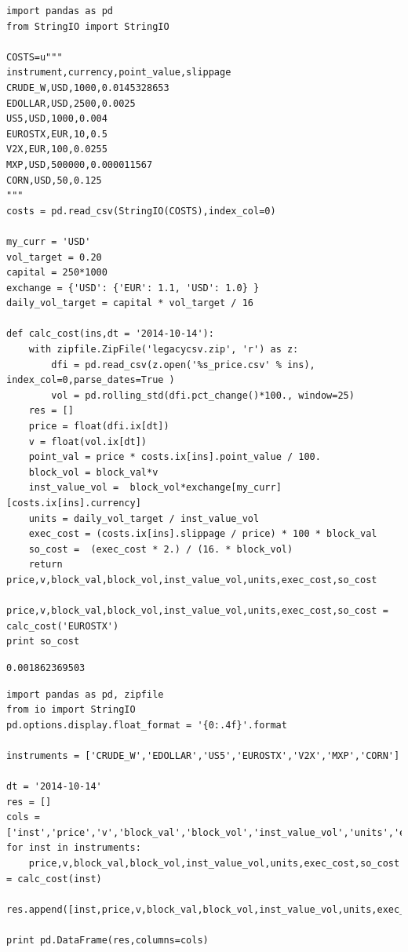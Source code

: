 \documentclass[12pt,fleqn]{article}\usepackage{../../common}
\begin{document}
\begin{verbatim}
import pandas as pd
from StringIO import StringIO

COSTS=u"""
instrument,currency,point_value,slippage
CRUDE_W,USD,1000,0.0145328653
EDOLLAR,USD,2500,0.0025
US5,USD,1000,0.004
EUROSTX,EUR,10,0.5
V2X,EUR,100,0.0255
MXP,USD,500000,0.000011567
CORN,USD,50,0.125
"""
costs = pd.read_csv(StringIO(COSTS),index_col=0)

my_curr = 'USD'
vol_target = 0.20
capital = 250*1000
exchange = {'USD': {'EUR': 1.1, 'USD': 1.0} }
daily_vol_target = capital * vol_target / 16

def calc_cost(ins,dt = '2014-10-14'):
    with zipfile.ZipFile('legacycsv.zip', 'r') as z:
        dfi = pd.read_csv(z.open('%s_price.csv' % ins), index_col=0,parse_dates=True )
        vol = pd.rolling_std(dfi.pct_change()*100., window=25)    
    res = []
    price = float(dfi.ix[dt])
    v = float(vol.ix[dt])
    point_val = price * costs.ix[ins].point_value / 100.
    block_vol = block_val*v
    inst_value_vol =  block_vol*exchange[my_curr][costs.ix[ins].currency]
    units = daily_vol_target / inst_value_vol
    exec_cost = (costs.ix[ins].slippage / price) * 100 * block_val
    so_cost =  (exec_cost * 2.) / (16. * block_vol)
    return price,v,block_val,block_vol,inst_value_vol,units,exec_cost,so_cost

price,v,block_val,block_vol,inst_value_vol,units,exec_cost,so_cost = calc_cost('EUROSTX')
print so_cost
\end{verbatim}

\begin{verbatim}
0.001862369503
\end{verbatim}


\begin{verbatim}
import pandas as pd, zipfile
from io import StringIO
pd.options.display.float_format = '{0:.4f}'.format    

instruments = ['CRUDE_W','EDOLLAR','US5','EUROSTX','V2X','MXP','CORN']
         
dt = '2014-10-14'
res = []
cols = ['inst','price','v','block_val','block_vol','inst_value_vol','units','exec_cost','so_cost']
for inst in instruments:
    price,v,block_val,block_vol,inst_value_vol,units,exec_cost,so_cost = calc_cost(inst)
    res.append([inst,price,v,block_val,block_vol,inst_value_vol,units,exec_cost,so_cost])
    
print pd.DataFrame(res,columns=cols)         
\end{verbatim}
\end{document}
